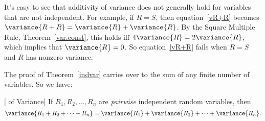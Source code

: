 It's easy to see that additivity of variance does not generally hold
for variables that are not independent.  For example, if $R=S$,
then equation~\eqref{vR+R} becomes $\variance{R + R} =
\variance{R} + \variance{R}$.  By the Square Multiple Rule,
Theorem~\ref{var.const}, this holds iff $4 \variance{R} = 2
\variance{R}$, which implies that $\variance{R}=0$.  So
equation~\eqref{vR+R} fails when $R=S$ and $R$ has nonzero
variance.

The proof of Theorem~\ref{indvar} carries over to
the sum of any finite number of variables.  So we have:

\begin{theorem}\label{thm:variance_additivity}
[ of Variance] If $R_1, R_2,
\dots, R_n$ are  \emph{pairwise}
independent random variables, then
\begin{equation}\label{vsum}
\variance{R_1 + R_2 + \cdots + R_n} = \variance{R_1} + \variance{R_2} +
  \cdots + \variance{R_n}.
\end{equation}
\end{theorem}
